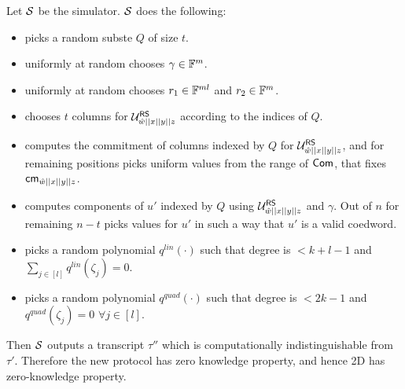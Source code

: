Let $\mathcal{S}$ be the simulator. $\mathcal{S}$ does the following:
\begin{itemize}
	\item  picks a random subste $Q$ of size $t$.
	\item  uniformly at random chooses $\gamma \in \mathbb{F}^m$.
	\item  uniformly at random chooses $r_1 \in \mathbb{F}^{ml}$ and $r_2 \in \mathbb{F}^m$.
	\item  chooses $t$ columns for $\mathcal{U}^{\mathsf{RS}}_{\hat{w}||x||y||z}$ according to the indices of $Q$.
	\item  computes the commitment of columns indexed by $Q$ for $\mathcal{U}^{\mathsf{RS}}_{\hat{w}||x||y||z}$, and for remaining positions picks uniform values from the range of $\mathsf{Com}$, that fixes $\mathsf{cm}_{\hat{w}||x||y||z}$.
	\item  computes components of $u'$ indexed by $Q$ using $\mathcal{U}^{\mathsf{RS}}_{\hat{w}||x||y||z}$ and $\gamma$. Out of $n$ for remaining $n-t$ picks values for $u'$ in such a way that $u'$ is a valid coedword.
	\item  picks a random polynomial $q^{lin}(\cdot)$ such that degree is $<k+l-1$ and $\sum_{j\in [l]} q^{lin}(\zeta_j) = 0$.
	\item  picks a random polynomial $q^{quad}(\cdot)$ such that degree is $<2k-1$ and $q^{quad}(\zeta_j) = 0$ $\forall j\in [l]$.
\end{itemize} 
Then $\mathcal{S}$ outputs a transcript $\tau''$ which is computationally indistinguishable from $\tau'$. Therefore the new protocol has zero knowledge property, and hence \name2D has zero-knowledge property.
\begin{comment}
\subsubsection{Proximity Test}
The correctness of the previous two checks, namely the linear check and the
quadratic check rely on the fact that the witness oracles are evaluations of
``low'' degree polynomials. There are several known low degree tests for polynomials
from PCP literature. The protocol in \cite{Aurora} uses a recent test for
proximity by Ben Sesson et al.\cite{IOPP_FRI2018} with particularly efficient
prover and $O(\log d)$ query complexity for polynomials of degree at most $d$. 
We use a variant of proximity test from \cite{Ligero2017}, adapting it to work
with homomorphic commitments of the RS-encoded oracles and reducing the query
complexity.
\end{comment}

